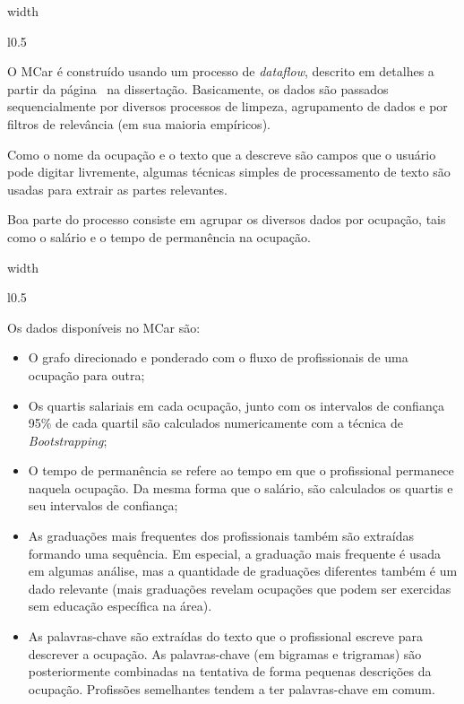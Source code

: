 \documentclass[10pt,a4paper,final]{article}
\newcommand\disappearingrule{%
  \par %
  \vskip10pt %
  \leaders\vrule width \textwidth\vskip0.4pt %
  \nointerlineskip %
  \vskip10pt %
}
\begin{document}
\disappearingrule

\begin{minipage}[t][18\baselineskip]{\linewidth}
  \begin{wrapfigure}{l}{0.5\textwidth}
  \end{wrapfigure}
  
  O MCar é construído usando um processo de \textit{dataflow}, descrito em detalhes a partir da página~\pageref{sec:construcao} na dissertação. Basicamente, os dados são passados sequencialmente por diversos processos de limpeza, agrupamento de dados e por filtros de relevância (em sua maioria empíricos).
  
  Como o nome da ocupação e o texto que a descreve são campos que o usuário pode digitar livremente, algumas técnicas simples de processamento de texto são usadas para extrair as partes relevantes.
  
  Boa parte do processo consiste em agrupar os diversos dados por ocupação, tais como o salário e o tempo de permanência na ocupação.
\end{minipage}

\disappearingrule

\begin{minipage}[t]{\linewidth}
  \begin{wrapfigure}{l}{0.5\textwidth}
  \end{wrapfigure}
  
  Os dados disponíveis no MCar são:

  \begin{itemize}
    \item O grafo direcionado e ponderado com o fluxo de profissionais de uma ocupação para outra;
    \item Os quartis salariais em cada ocupação, junto com os intervalos de confiança 95\% de cada quartil são calculados numericamente com a técnica de \textit{Bootstrapping};
    \item O tempo de permanência se refere ao tempo em que o profissional permanece naquela ocupação. Da mesma forma que o salário, são calculados os quartis e seu intervalos de confiança;
    \item As graduações mais frequentes dos profissionais também são extraídas formando uma sequência. Em especial, a graduação mais frequente é usada em algumas análise, mas a quantidade de graduações diferentes também é um dado relevante (mais graduações revelam ocupações que podem ser exercidas sem educação específica na área).
    \item As palavras-chave são extraídas do texto que o profissional escreve para descrever a ocupação. As palavras-chave (em bigramas e trigramas) são posteriormente combinadas na tentativa de forma pequenas descrições da ocupação. Profissões semelhantes tendem a ter palavras-chave em comum.
  \end{itemize}
\end{minipage}
\end{document}
